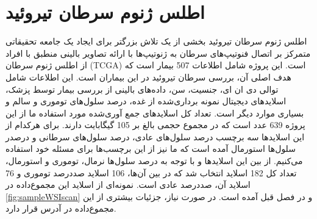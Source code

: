 \section{اطلس ژنوم سرطان تیروئید}\label{subsec:موسسه-ملی-سرطان-پورتال-داده-های-مشترک-ژنومیک}

اطلس ژنوم سرطان تیروئید بخشی از یک تلاش بزرگتر برای ایجاد یک جامعه تحقیقاتی متمرکز بر اتصال فنوتیپ‌های سرطان به ژنوتیپ‌ها با ارائه تصاویر بالینی منطبق با افراد از اطلس ژنوم سرطان\cite{clark2013cancer} (TCGA) است.
این پروژه شامل اطلاعات 507 بیمار است که هدف اصلی آن، بررسی سرطان تیروئید در این بیماران است.
این اطلاعات شامل توالی دی ان ای، جنسیت، سن، داده‌های بالینی از بررسی بیمار توسط پزشک، اسلایدهای دیجیتال نمونه برداری‌شده از غده، درصد سلول‌های توموری و سالم و بسیاری موارد دیگر است.
تعداد کل اسلاید‌های جمع آوری‌شده مورد استفاده ما از این پروژه 639 عدد است که در مجموع حجمی بالغ بر 105 گیگابایت دارند. برای هرکدام از این اسلاید‌ها سه برچسب درصد سلول‌های عادی، درصد سلول‌های سرطانی و درصدر سلول‌ها استورمال آمده است که ما نیز از این برچسب‌ها برای مسئله خود استفاده می‌کنیم. از بین این اسلاید‌ها و با توجه به درصد سلول‌ها نرمال، توموری و استورمال، تعداد کل 182 اسلاید انتخاب شد که در بین آن‌ها، 106 اسلاید صددرصد توموری و 76 اسلاید آن، صددرصد عادی است.
نمونه‌ای از اسلاید این مجموع‌داده در \ref{fig:sampleWSIscan}  و در فصل قبل آمده است.
در صورت نیاز، جزئیات بیشتری از این مجموع‌داده در آدرس \cite{ncigdc} قرار دارد.